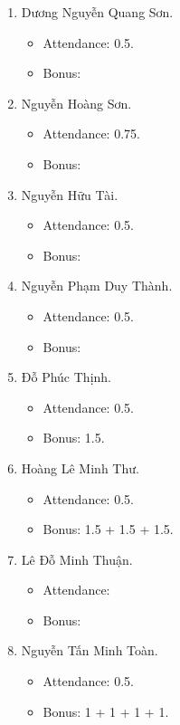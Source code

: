 \documentclass{article}
\begin{document}
\begin{enumerate}
    \item {\sc Dương Nguyễn Quang Sơn.}
    \begin{itemize}
        \item Attendance: 0.5.
        \item Bonus:
    \end{itemize}
    \item {\sc Nguyễn Hoàng Sơn.}
    \begin{itemize}
        \item Attendance: 0.75.
        \item Bonus:
    \end{itemize}
    \item {\sc Nguyễn Hữu Tài.}
    \begin{itemize}
        \item Attendance: 0.5.
        \item Bonus:
    \end{itemize}
    \item {\sc Nguyễn Phạm Duy Thành.}
    \begin{itemize}
        \item Attendance: 0.5.
        \item Bonus:
    \end{itemize}
    \item {\sc Đỗ Phúc Thịnh.}
    \begin{itemize}
        \item Attendance: 0.5.
        \item Bonus: 1.5.
    \end{itemize}
    \item {\sc Hoàng Lê Minh Thư.}
    \begin{itemize}
        \item Attendance: 0.5.
        \item Bonus: 1.5 + 1.5 + 1.5.
    \end{itemize}
    \item {\sc Lê Đỗ Minh Thuận.}
    \begin{itemize}
        \item Attendance:
        \item Bonus:
    \end{itemize}
    \item {\sc Nguyễn Tấn Minh Toàn.}
    \begin{itemize}
        \item Attendance: 0.5.
        \item Bonus: 1 + 1 + 1 + 1.
    \end{itemize}

\end{enumerate}
\end{document}
